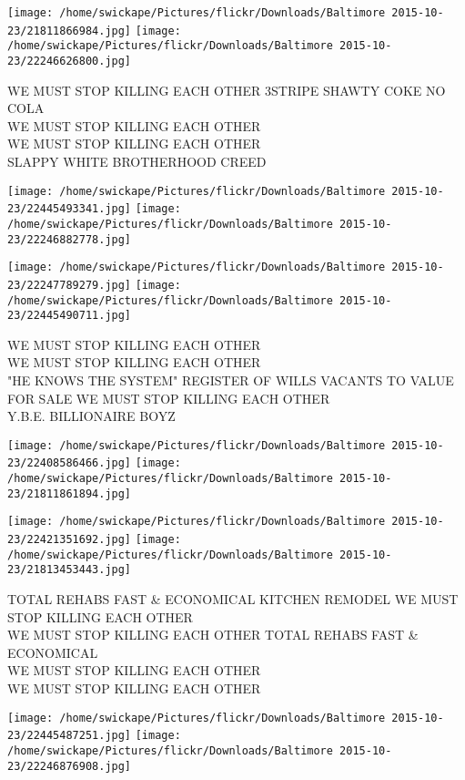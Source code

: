 \documentclass[10pt,letterpaper]{article}
\begin{document}
\texttt{[image: /home/swickape/Pictures/flickr/Downloads/Baltimore 2015-10-23/21811866984.jpg]}
\texttt{[image: /home/swickape/Pictures/flickr/Downloads/Baltimore 2015-10-23/22246626800.jpg]}

WE MUST STOP KILLING EACH OTHER 3STRIPE SHAWTY COKE NO COLA\\
WE MUST STOP KILLING EACH OTHER\\
WE MUST STOP KILLING EACH OTHER\\
SLAPPY WHITE BROTHERHOOD CREED
\pagebreak

\texttt{[image: /home/swickape/Pictures/flickr/Downloads/Baltimore 2015-10-23/22445493341.jpg]}
\texttt{[image: /home/swickape/Pictures/flickr/Downloads/Baltimore 2015-10-23/22246882778.jpg]}

\texttt{[image: /home/swickape/Pictures/flickr/Downloads/Baltimore 2015-10-23/22247789279.jpg]}
\texttt{[image: /home/swickape/Pictures/flickr/Downloads/Baltimore 2015-10-23/22445490711.jpg]}

WE MUST STOP KILLING EACH OTHER\\
WE MUST STOP KILLING EACH OTHER\\
"HE KNOWS THE SYSTEM" REGISTER OF WILLS VACANTS TO VALUE FOR SALE WE MUST STOP KILLING EACH OTHER\\
Y.B.E. BILLIONAIRE BOYZ
\pagebreak

\texttt{[image: /home/swickape/Pictures/flickr/Downloads/Baltimore 2015-10-23/22408586466.jpg]}
\texttt{[image: /home/swickape/Pictures/flickr/Downloads/Baltimore 2015-10-23/21811861894.jpg]}

\texttt{[image: /home/swickape/Pictures/flickr/Downloads/Baltimore 2015-10-23/22421351692.jpg]}
\texttt{[image: /home/swickape/Pictures/flickr/Downloads/Baltimore 2015-10-23/21813453443.jpg]}

TOTAL REHABS FAST \& ECONOMICAL KITCHEN REMODEL WE MUST STOP KILLING EACH OTHER\\
WE MUST STOP KILLING EACH OTHER TOTAL REHABS FAST \& ECONOMICAL\\
WE MUST STOP KILLING EACH OTHER\\
WE MUST STOP KILLING EACH OTHER
\pagebreak

\texttt{[image: /home/swickape/Pictures/flickr/Downloads/Baltimore 2015-10-23/22445487251.jpg]}
\texttt{[image: /home/swickape/Pictures/flickr/Downloads/Baltimore 2015-10-23/22246876908.jpg]}
\end{document}
